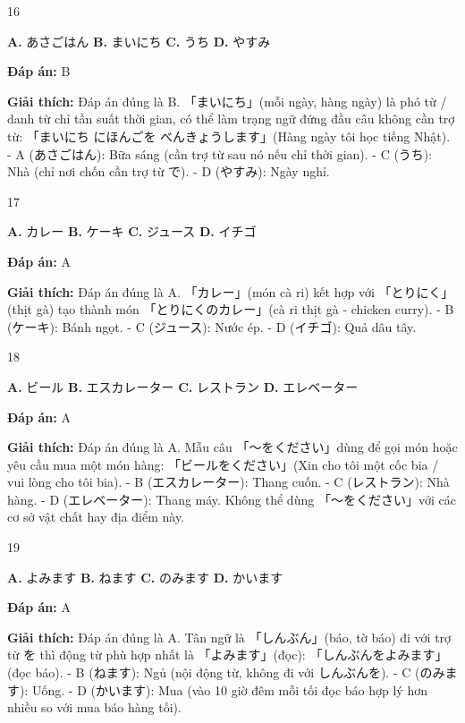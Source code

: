 \documentclass[12pt,a4paper]{report}
\newcommand{\source}[1]{}
\newcommand{\choice}[2]{\textbf{#1.} #2 \quad}
\newcommand{\answer}[1]{\par\textbf{Đáp án:} #1}
\newcommand{\confidence}[1]{}
\newcommand{\explain}[1]{\par\textbf{Giải thích:} #1\vspace{0.5cm}}
\begin{document}
\begin{question}{16}
\source{16.webp}
\choice{A}{あさごはん}
\choice{B}{まいにち}
\choice{C}{うち}
\choice{D}{やすみ}
\answer{B}
\confidence{high}
\explain{Đáp án đúng là B. 「まいにち」(mỗi ngày, hàng ngày) là phó từ / danh từ chỉ tần suất thời gian, có thể làm trạng ngữ đứng đầu câu không cần trợ từ: 「まいにち にほんごを べんきょうします」(Hàng ngày tôi học tiếng Nhật).
- A (あさごはん): Bữa sáng (cần trợ từ sau nó nếu chỉ thời gian).
- C (うち): Nhà (chỉ nơi chốn cần trợ từ で).
- D (やすみ): Ngày nghỉ.}
\end{question}

\begin{question}{17}
\source{17.webp}
\choice{A}{カレー}
\choice{B}{ケーキ}
\choice{C}{ジュース}
\choice{D}{イチゴ}
\answer{A}
\confidence{high}
\explain{Đáp án đúng là A. 「カレー」(món cà ri) kết hợp với 「とりにく」(thịt gà) tạo thành món 「とりにくのカレー」(cà ri thịt gà - chicken curry).
- B (ケーキ): Bánh ngọt.
- C (ジュース): Nước ép.
- D (イチゴ): Quả dâu tây.}
\end{question}

\begin{question}{18}
\source{23.webp}
\choice{A}{ビール}
\choice{B}{エスカレーター}
\choice{C}{レストラン}
\choice{D}{エレベーター}
\answer{A}
\confidence{high}
\explain{Đáp án đúng là A. Mẫu câu 「〜をください」dùng để gọi món hoặc yêu cầu mua một món hàng: 「ビールをください」(Xin cho tôi một cốc bia / vui lòng cho tôi bia).
- B (エスカレーター): Thang cuốn.
- C (レストラン): Nhà hàng.
- D (エレベーター): Thang máy.
Không thể dùng 「〜をください」với các cơ sở vật chất hay địa điểm này.}
\end{question}

\begin{question}{19}
\source{28.webp}
\choice{A}{よみます}
\choice{B}{ねます}
\choice{C}{のみます}
\choice{D}{かいます}
\answer{A}
\confidence{high}
\explain{Đáp án đúng là A. Tân ngữ là 「しんぶん」(báo, tờ báo) đi với trợ từ を thì động từ phù hợp nhất là 「よみます」(đọc): 「しんぶんをよみます」(đọc báo).
- B (ねます): Ngủ (nội động từ, không đi với しんぶんを).
- C (のみます): Uống.
- D (かいます): Mua (vào 10 giờ đêm mỗi tối đọc báo hợp lý hơn nhiều so với mua báo hàng tối).}
\end{question}
\end{document}
